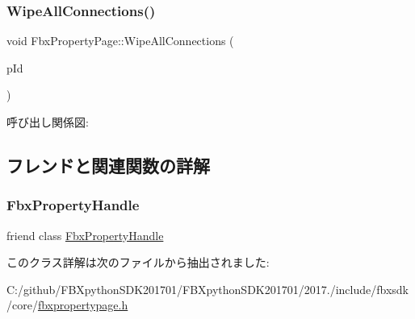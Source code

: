 \subsubsection{\texorpdfstring{Wipe\+All\+Connections()}{WipeAllConnections()}}
{\footnotesize\ttfamily void Fbx\+Property\+Page\+::\+Wipe\+All\+Connections (\begin{DoxyParamCaption}\item[{\hyperlink{fbxtypes_8h_a088fa96de3b0b3ea69f0f6afef525dfb}{Fbx\+Int}}]{p\+Id }\end{DoxyParamCaption})}

呼び出し関係図\+:


\subsection{フレンドと関連関数の詳解}
\mbox{\label{class_fbx_property_page_a22125c271a14844d33fa71927b100f2d}} 
\subsubsection{\texorpdfstring{Fbx\+Property\+Handle}{FbxPropertyHandle}}
{\footnotesize\ttfamily friend class \hyperlink{class_fbx_property_handle}{Fbx\+Property\+Handle}\hspace{0.3cm}{\ttfamily [friend]}}



このクラス詳解は次のファイルから抽出されました\+:\begin{DoxyCompactItemize}
\item 
C\+:/github/\+F\+B\+Xpython\+S\+D\+K201701/\+F\+B\+Xpython\+S\+D\+K201701/2017./include/fbxsdk/core/\hyperlink{fbxpropertypage_8h}{fbxpropertypage.\+h}\end{DoxyCompactItemize}
